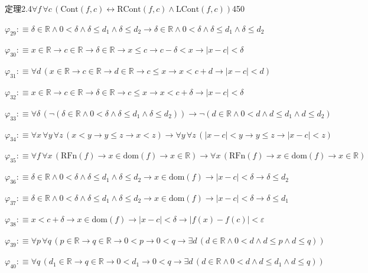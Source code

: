 \begin{fullproof}{定理2.4}{$\forall f\,\forall c\,(\mathrm{Cont}(f,c) \leftrightarrow \mathrm{RCont}(f,c) \land \mathrm{LCont}(f,c))$}{450}
\begin{abbrevlist}
\item $\varphi_{29} :\equiv \delta \in \mathbb{R} \land 0 < \delta \land \delta \leq d_{1} \land \delta \leq d_{2} \to \delta \in \mathbb{R} \land 0 < \delta \land \delta \leq d_{1} \land \delta \leq d_{2}$
\item $\varphi_{30} :\equiv x \in \mathbb{R} \to c \in \mathbb{R} \to \delta \in \mathbb{R} \to x \leq c \to c - \delta < x \to \lvert x - c \rvert < \delta$
\item $\varphi_{31} :\equiv \forall d\,(x \in \mathbb{R} \to c \in \mathbb{R} \to d \in \mathbb{R} \to c \leq x \to x < c + d \to \lvert x - c \rvert < d)$
\item $\varphi_{32} :\equiv x \in \mathbb{R} \to c \in \mathbb{R} \to \delta \in \mathbb{R} \to c \leq x \to x < c + \delta \to \lvert x - c \rvert < \delta$
\item $\varphi_{33} :\equiv \forall \delta\,(\neg (\delta \in \mathbb{R} \land 0 < \delta \land \delta \leq d_{1} \land \delta \leq d_{2})) \to \neg (d \in \mathbb{R} \land 0 < d \land d \leq d_{1} \land d \leq d_{2})$
\item $\varphi_{34} :\equiv \forall x\,\forall y\,\forall z\,(x < y \to y \leq z \to x < z) \to \forall y\,\forall z\,(\lvert x - c \rvert < y \to y \leq z \to \lvert x - c \rvert < z)$
\item $\varphi_{35} :\equiv \forall f\,\forall x\,(\mathrm{RFn}(f) \to x \in \mathrm{dom}(f) \to x \in \mathbb{R}) \to \forall x\,(\mathrm{RFn}(f) \to x \in \mathrm{dom}(f) \to x \in \mathbb{R})$
\item $\varphi_{36} :\equiv \delta \in \mathbb{R} \land 0 < \delta \land \delta \leq d_{1} \land \delta \leq d_{2} \to x \in \mathrm{dom}(f) \to \lvert x - c \rvert < \delta \to \delta \leq d_{2}$
\item $\varphi_{37} :\equiv \delta \in \mathbb{R} \land 0 < \delta \land \delta \leq d_{1} \land \delta \leq d_{2} \to x \in \mathrm{dom}(f) \to \lvert x - c \rvert < \delta \to \delta \leq d_{1}$
\item $\varphi_{38} :\equiv x < c + \delta \to x \in \mathrm{dom}(f) \to \lvert x - c \rvert < \delta \to \lvert f(x) - f(c) \rvert < \varepsilon$
\item $\varphi_{39} :\equiv \forall p\,\forall q\,(p \in \mathbb{R} \to q \in \mathbb{R} \to 0 < p \to 0 < q \to \exists d\,(d \in \mathbb{R} \land 0 < d \land d \leq p \land d \leq q))$
\item $\varphi_{40} :\equiv \forall q\,(d_{1} \in \mathbb{R} \to q \in \mathbb{R} \to 0 < d_{1} \to 0 < q \to \exists d\,(d \in \mathbb{R} \land 0 < d \land d \leq d_{1} \land d \leq q))$

\end{abbrevlist}
\end{fullproof}

